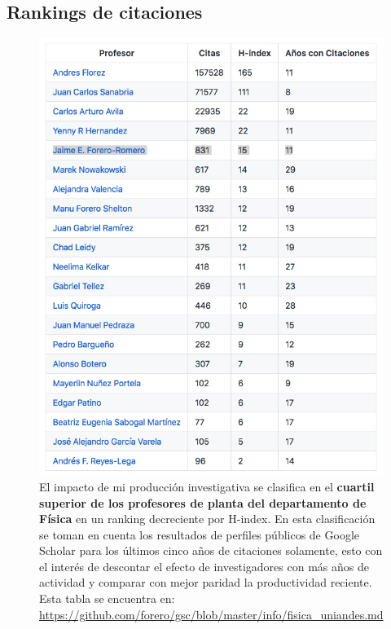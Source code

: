\documentclass{article}
\begin{document}
\subsection{Rankings de citaciones}
\begin{figure}[!h]
\begin{center}
\includegraphics[scale=0.5]{scholar_fisica.png}
\caption{
El impacto de mi producci\'on investigativa se clasifica en el {\bf cuartil
  superior de los profesores de planta del departamento de F\'isica} en
  un ranking decreciente por H-index. 
  En esta clasificaci\'on se toman en cuenta los resultados de
  perfiles p\'ublicos de Google Scholar
  para los \'ultimos cinco a\~nos de citaciones solamente, esto con el
  inter\'es de descontar el efecto de investigadores con m\'as a\~nos de
  actividad y comparar con mejor paridad la productividad
  reciente. Esta tabla se encuentra en: \url{https://github.com/forero/gsc/blob/master/info/fisica_uniandes.md}\label{table:fisica}}
\end{center}
\end{figure}
\end{document}

